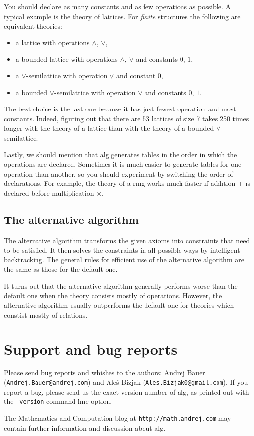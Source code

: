 \documentclass{article}
\begin{document}
You should declare as many constants and as few operations as
possible. A typical example is the theory of lattices. For
\emph{finite} structures the following are equivalent theories:
%
\begin{itemize}
\item a lattice with operations $\land$, $\lor$,
\item a bounded lattice with operations $\land$, $\lor$
  and constants $0$, $1$,
\item a $\lor$-semilattice with operation $\lor$ and constant $0$,
\item a bounded $\lor$-semilattice with operation $\lor$
  and constants $0$, $1$.
\end{itemize}
%
The best choice is the last one because it has just fewest operation and
most constants. Indeed, figuring out that there are 53 lattices of size
7 takes 250 times longer with the theory of a lattice than with the
theory of a bounded $\lor$-semilattice.

Lastly, we should mention that alg generates tables in the order in
which the operations are declared. Sometimes it is much easier to
generate tables for one operation than another, so you should experiment
by switching the order of declarations. For example, the theory of a
ring works much faster if addition $+$ is declared before
multiplication $\times$.

\subsection{The alternative algorithm}
\label{sec:altern-algor}

The alternative algorithm transforms the given axioms into constraints
that need to be satisfied. It then solves the constraints in all
possible ways by intelligent backtracking. The general rules for
efficient use of the alternative algorithm are the same as those for
the default one.

It turns out that the alternative algorithm generally performs worse
than the default one when the theory consists mostly of operations.
However, the alternative algorithm usually outperforms the default one
for theories which constist mostly of relations.

\section{Support and bug reports}
\label{sec:support-bug-reports}

Please send bug reports and whishes to the authors: Andrej Bauer
(\texttt{Andrej.Bauer@andrej.com}) and Aleš Bizjak
(\texttt{Ales.Bizjak0@gmail.com}). If you report a bug, please send us
the exact version number of alg, as printed out with the
\texttt{--version} command-line option.

The Mathematics and Computation blog at
\texttt{http://math.andrej.com} may contain further information and
discussion about alg.
\end{document}
